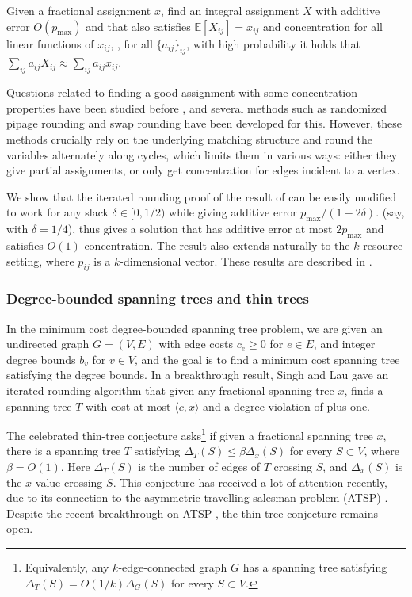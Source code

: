 \documentclass{toc}
\newcommand{\ip}[1]{\langle #1 \rangle}
\newcommand{\E}{\mathbb{E}}
\begin{document}
\begin{question}
Given a fractional assignment $x$, find an integral assignment $X$ with additive error $O(p_{\max})$ and that also satisfies $\E[X_{ij}]=x_{ij}$ and
concentration for all linear functions of $x_{ij}$, \ie, for all $\{a_{ij}\}_{ij}$,  with high probability it holds that $\sum_{ij} a_{ij} X_{ij} \approx \sum_{ij} a_{ij} x_{ij}$.
\end{question}


Questions related to finding a good assignment with some concentration properties have been studied before \cite{GKPS06,AFK,CVZ11}, and several methods such as randomized pipage rounding and swap rounding have been developed for this.
However, these methods crucially rely on the underlying matching structure and round the variables alternately along cycles, which limits them in various ways: either they give partial assignments, or only get concentration for edges incident to a vertex.


 We show that the iterated rounding proof of the result of \cite{LST} can be easily modified to  work for any slack $\delta \in [0,1/2)$ while giving additive error $p_{\max}/(1-2\delta)$. 
 (say, with $\delta=1/4$), thus gives a solution that 
has additive error at most
$2p_{\max}$ and satisfies $O(1)$-concentration.
The result also extends naturally to the $k$-resource setting, where $p_{ij}$ is a $k$-dimensional vector. These results are described in .

\subsubsection{Degree-bounded spanning trees and thin trees}
In the minimum cost degree-bounded spanning tree problem, we are
given an undirected graph $G=(V,E)$ with edge costs $c_e \geq 0$ for $e \in E$, and integer degree bounds $b_v$ for $v \in V$,
and the goal is to find a minimum cost spanning tree satisfying the degree bounds.
In a breakthrough result, Singh and Lau \cite{SL07} gave an iterated rounding algorithm that given any fractional spanning tree $x$, finds a spanning tree $T$ with cost at most $\ip{c, x}$ and a degree violation of plus one.





%



The celebrated thin-tree conjecture asks\footnote{Equivalently, any $k$-edge-connected graph $G$ has a spanning  tree satisfying ~$\Delta_T(S) = O(1/k) \Delta_G(S)$ for every $S \subset V$.} if given a fractional spanning tree $x$, there is a spanning tree $T$ satisfying $ \Delta_T(S) \leq \beta \Delta_x(S)$ for every $S\subset{V}$, where $\beta=O(1)$. Here $\Delta_T(S)$ is the number of edges of $T$ crossing $S$, and $\Delta_x(S)$ is the $x$-value crossing $S$.
 This conjecture has received a lot of attention recently, due to its connection to the asymmetric travelling salesman problem (ATSP) \cite{AGMOS10, AO15}. Despite the recent breakthrough on ATSP \cite{STV18}, the thin-tree conjecture remains open.
\end{document}
